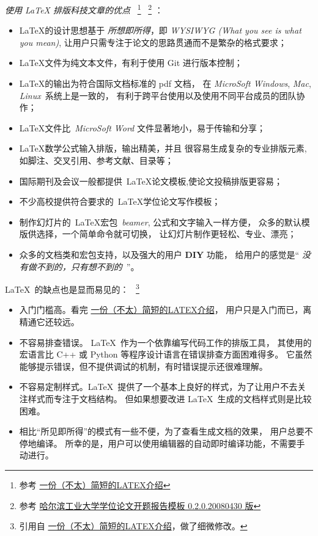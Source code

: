 \documentclass[
    11pt,
    cite=authoryear,
    device=normal,
    lang=cn,
    mode=simple,
    result=answer,
    toc=onecol,
]{elegantbook_sierxue}
\begin{document}
\emph{使用 {\rm\LaTeX{}} 排版科技文章的优点}
~\footnote{参考
    \href{https://www.ctan.org/tex-archive/info/lshort/chinese}
                {一份（不太）简短的LATEX介绍}
}
~\footnote{参考
    \href{https://github.com/HymanHuang/plutothesis/tree/master/PlutoKaiTi/a4paper}
    {哈尔滨工业大学学位论文开题报告模板 0.2.0.20080430 版}
}
：
\begin{itemize}
    \item \LaTeX{}的设计思想基于 \emph{所想即所得}，即 \emph{WYSIWYG
        (What you see is what you mean)},
        让用户只需专注于论文的思路贯通而不是繁杂的格式要求；
    \item \LaTeX 文件为纯文本文件，有利于使用 Git 进行版本控制；
    \item \LaTeX 的输出为符合国际文档标准的 pdf 文档，
        在 \emph{MicroSoft Windows},
        \emph{Mac}, \emph{Linux}~系统上是一致的，
        有利于跨平台使用以及使用不同平台成员的团队协作；
    \item \LaTeX 文件比~\emph{MicroSoft Word} 文件显著地小，易于传输和分享；
    \item \LaTeX 数学公式输入排版，输出精美，并且
        很容易生成复杂的专业排版元素,如脚注、交叉引用、参考文献、目录等；
    \item 国际期刊及会议一般都提供~\LaTeX 论文模板,使论文投稿排版更容易；
    \item 不少高校提供符合要求的~\LaTeX{}学位论文写作模板；
    \item 制作幻灯片的~\LaTeX 宏包~\emph{beamer}, 公式和文字输入一样方便，
        众多的默认模版供选择，一个简单命令就可切换，
        让幻灯片制作更轻松、专业、漂亮；
    \item  众多的文档类和宏包支持，以及强大的用户 {\bf DIY} 功能，
          给用户的感觉是`` \emph{没有做不到的，只有想不到的}~''。
\end{itemize}

\LaTeX\ 的缺点也是显而易见的：
~\footnote{引用自
    \href{https://www.ctan.org/tex-archive/info/lshort/chinese}
        {一份（不太）简短的LATEX介绍}，做了细微修改。
}
\begin{itemize}
    \item 入门门槛高。看完
        \href{https://www.ctan.org/tex-archive/info/lshort/chinese}
                {一份（不太）简短的LATEX介绍}，
        用户只是入门而已，离精通它还较远。
    \item 不容易排查错误。
        \LaTeX\ 作为一个依靠编写代码工作的排版工具，
        其使用的宏语言比 C++ 或 Python 等程序设计语言在错误排查方面困难得多。
        它虽然能够提示错误，但不提供调试的机制，有时错误提示还很难理解。
    \item 不容易定制样式。\LaTeX\
        提供了一个基本上良好的样式，为了让用户不去关注样式而专注于文档结构。
        但如果想要改进 \LaTeX\ 生成的文档样式则是比较困难。
    \item 相比“所见即所得”的模式有一些不便，为了查看生成文档的效果，
        用户总要不停地编译。
        所幸的是，用户可以使用编辑器的自动即时编译功能，不需要手动进行。
\end{itemize}
\newpage
\end{document}
